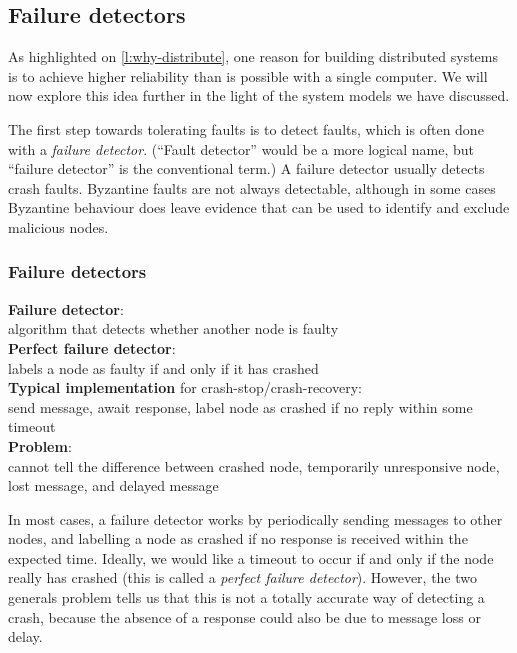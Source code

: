 \subsection{Failure detectors}\label{sec:failure-detectors}

As highlighted on \autoref{l:why-distribute}, one reason for building distributed systems is to achieve higher reliability than is possible with a single computer.
We will now explore this idea further in the light of the system models we have discussed.

The first step towards tolerating faults is to detect faults, which is often done with a \emph{failure detector}.
(``Fault detector'' would be a more logical name, but ``failure detector'' is the conventional term.)
A failure detector usually detects crash faults.
Byzantine faults are not always detectable, although in some cases Byzantine behaviour does leave evidence that can be used to identify and exclude malicious nodes.

\begin{frame}
    \label{s:failure-detector}
    \frametitle{Failure detectors}
    \textbf{Failure detector}:\\algorithm that detects whether another node is faulty\\[1em]
    \textbf{Perfect failure detector}:\\labels a node as faulty if and only if it has crashed\\[1em]\pause
    \textbf{Typical implementation} for crash-stop/crash-recovery:\\
    send message, await response, label node as crashed if no reply within some timeout\\[1em]\pause
    \textbf{Problem}:\\cannot tell the difference between crashed node, temporarily
    unresponsive node, lost message, and delayed message\\[1em]
\end{frame}
\label{l:failure-detector}

In most cases, a failure detector works by periodically sending messages to other nodes, and labelling a node as crashed if no response is received within the expected time.
Ideally, we would like a timeout to occur if and only if the node really has crashed (this is called a \emph{perfect failure detector}).
However, the two generals problem tells us that this is not a totally accurate way of detecting a crash, because the absence of a response could also be due to message loss or delay.

